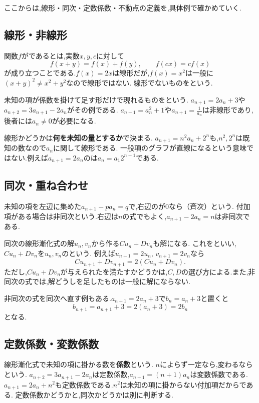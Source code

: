 \label{節：用語の意味}
ここからは,線形・同次・定数係数・不動点の定義を,具体例で確かめていく.

\subsection{線形・非線形}\label{節：線形・非線形}
関数$f$が\textbf{}であるとは,実数$x,y,c$に対して
\[
  f(x+y)=f(x)+f(y),\qquad f(cx)=cf(x)
\]
が成り立つことである.$f(x)=2x$は線形だが,$f(x)=x^2$は一般に$(x+y)^2\ne x^2+y^2$なので線形ではない.
線形でないものを\textbf{}という.

未知の項が係数を掛けて足す形だけで現れるものを\textbf{}という.
$a_{n+1}=2a_n+3$や$a_{n+2}=3a_{n+1}-2a_n$がその例である.
$a_{n+1}=a_n^2+1$や$a_{n+1}=\frac{1}{a_n}$は非線形であり,後者には$a_n\ne0$が必要になる.

線形かどうかは\textbf{何を未知の量とするか}で決まる.
$a_{n+1}=n^2a_n+2^n$も,$n^2,2^n$は既知の数なので$a_n$に関して線形である.
一般項のグラフが直線になるという意味ではない.例えば$a_{n+1}=2a_n$のは$a_n=a_1 2^{n-1}$である.

\subsection{同次・重ね合わせ}\label{節：同次・重ね合わせ}
未知の項を左辺に集めた$a_{n+1}-pa_n=q$で,右辺のが$0$なら\textbf{}（斉次）という.
付加項がある場合は非同次という.右辺は$n$の式でもよく,$a_{n+1}-2a_n=n$は非同次である.

同次の線形漸化式の解$u_n,v_n$から作る$Cu_n+Dv_n$も解になる.
これを\textbf{}といい,$Cu_n+Dv_n$を$u_n,v_n$の\textbf{}という.
例えば$u_{n+1}=2u_n$, $v_{n+1}=2v_n$なら
\[
  Cu_{n+1}+Dv_{n+1}=2(Cu_n+Dv_n).
\]
ただし,$Cu_n+Dv_n$が与えられたを満たすかどうかは,$C,D$の選び方による.また,非同次の式では,解どうしを足したものは一般に解にならない.

非同次の式を同次へ直す例もある.$a_{n+1}=2a_n+3$で$b_n=a_n+3$と置くと
\[
  b_{n+1}=a_{n+1}+3=2(a_n+3)=2b_n
\]
となる.

\subsection{定数係数・変数係数}\label{節：定数係数・変数係数}
線形漸化式で未知の項に掛かる数を\textbf{係数}という.
$n$によらず一定なら\textbf{},変わるなら\textbf{}という.
$a_{n+2}=3a_{n+1}-2a_n$は定数係数,$a_{n+1}=(n+1)a_n$は変数係数である.
$a_{n+1}=2a_n+n^2$も定数係数である.$n^2$は未知の項に掛からない付加項だからである.
定数係数かどうかと,同次かどうかは別に判断する.


